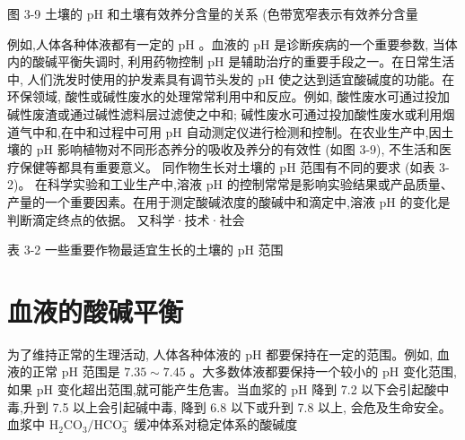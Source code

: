 \documentclass[10pt]{article}
\begin{document}
图 3-9 土壤的 \(\mathrm{{pH}}\) 和土壤有效养分含量的关系 (色带宽窄表示有效养分含量

例如,人体各种体液都有一定的 \(\mathrm{{pH}}\) 。血液的 \(\mathrm{{pH}}\) 是诊断疾病的一个重要参数, 当体内的酸碱平衡失调时, 利用药物控制 \(\mathrm{{pH}}\) 是辅助治疗的重要手段之一。在日常生活中, 人们洗发时使用的护发素具有调节头发的 \(\mathrm{{pH}}\) 使之达到适宜酸碱度的功能。在环保领域, 酸性或碱性废水的处理常常利用中和反应。例如, 酸性废水可通过投加碱性废渣或通过碱性滤料层过滤使之中和; 碱性废水可通过投加酸性废水或利用烟道气中和,在中和过程中可用 \(\mathrm{{pH}}\) 自动测定仪进行检测和控制。在农业生产中,因土壤的 \(\mathrm{{pH}}\) 影响植物对不同形态养分的吸收及养分的有效性 (如图 3-9), 不生活和医疗保健等都具有重要意义。 同作物生长对土壤的 \(\mathrm{{pH}}\) 范围有不同的要求 (如表 3-2)。 在科学实验和工业生产中,溶液 \(\mathrm{{pH}}\) 的控制常常是影响实验结果或产品质量、产量的一个重要因素。在用于测定酸碱浓度的酸碱中和滴定中,溶液 \(\mathrm{{pH}}\) 的变化是判断滴定终点的依据。 又科学·技术·社会

表 3-2 一些重要作物最适宜生长的土壤的 \(\mathrm{{pH}}\) 范围

\begin{center}
\end{center}

\section*{血液的酸碱平衡}

为了维持正常的生理活动, 人体各种体液的 \(\mathrm{{pH}}\) 都要保持在一定的范围。例如, 血液的正常 \(\mathrm{{pH}}\) 范围是 \({7.35} \sim {7.45}\) 。大多数体液都要保持一个较小的 \(\mathrm{{pH}}\) 变化范围,如果 \(\mathrm{{pH}}\) 变化超出范围,就可能产生危害。当血浆的 \(\mathrm{{pH}}\) 降到 7.2 以下会引起酸中毒,升到 7.5 以上会引起碱中毒, 降到 6.8 以下或升到 7.8 以上, 会危及生命安全。血浆中 \({\mathrm{H}}_{2}{\mathrm{{CO}}}_{3}/{\mathrm{{HCO}}}_{3}^{ - }\) 缓冲体系对稳定体系的酸碱度
\end{document}
